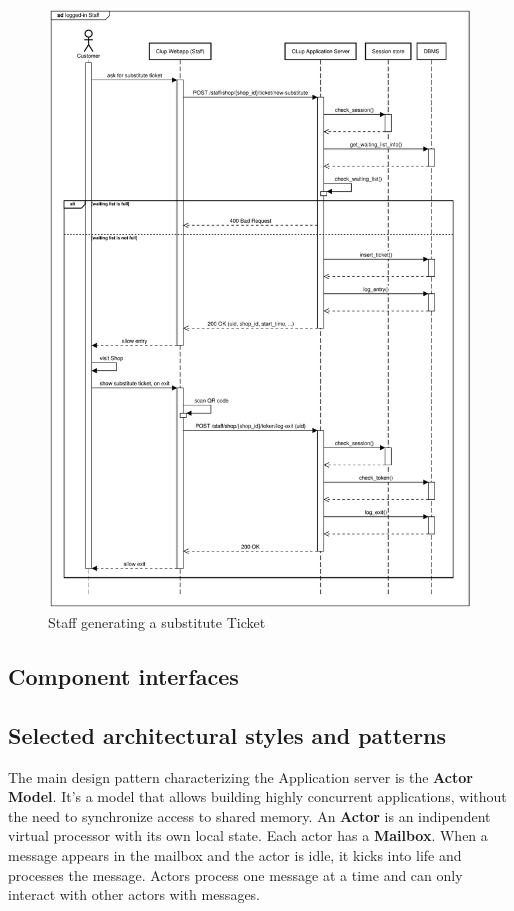 \begin{figure}[H]
    \centering
    \includegraphics[width=1\textwidth]{Images/runtime_substitute.pdf}
    \caption{Staff generating a substitute Ticket}
\end{figure}

\subsection{Component interfaces}

\label{sect:api}


\label{sect:patterns}
\subsection{Selected architectural styles and patterns}
The main design pattern characterizing the Application server is the \textbf{Actor Model}\cite{10.5555/1624775.1624804}. It's a model that allows building highly concurrent applications, without the need to synchronize access to shared memory.
An \textbf{Actor} is an indipendent virtual processor with its own local state. Each actor has a \textbf{Mailbox}. When a message appears in the mailbox and the actor is idle, it kicks into life and processes the message\cite{pragmatic}. Actors process one message at a time and can only interact with other actors with messages.

